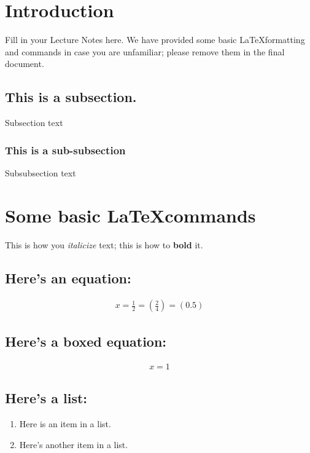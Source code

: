 \documentclass[12pt]{report}
\begin{document}
\maketitle
\tableofcontents


\section{Introduction}
Fill in your Lecture Notes here. We have provided some basic \LaTeX formatting and commands in case you are unfamiliar; please remove them in the final document. 

\subsection{This is a subsection.}
Subsection text

\subsubsection{This is a sub-subsection}
Subsubsection text


\section{Some basic \LaTeX commands}

This is how you \emph{italicize} text; this is how to \textbf{bold} it. 

\subsection{Here's an equation:}
\begin{align}
    x = \frac{1}{2} = \left( \frac{2}{4} \right) = (0.5)
\end{align}

\subsection{Here's a boxed equation: }
\begin{align}
    \boxed{x = 1}
\end{align}

\subsection{Here's a list: }
\begin{enumerate}
    \item Here is an item in a list.
    \item Here's another item in a list.
\end{enumerate}
\end{document}

